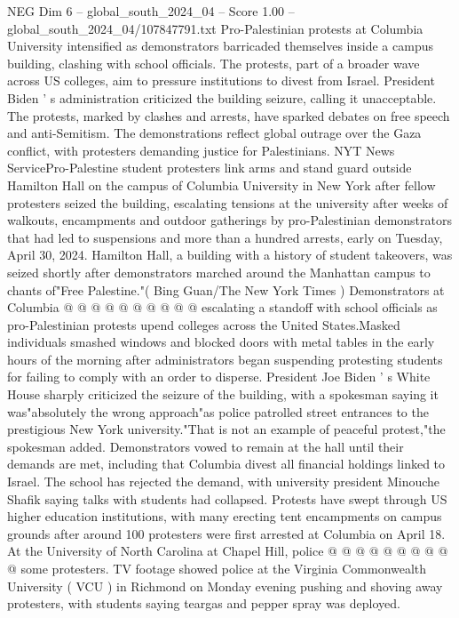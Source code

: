 \begin{textsample}{NEG Dim 6 – global\_south\_2024\_04 – Score 1.00 – global\_south\_2024\_04/107847791.txt}  \label{ex:f6_neg_363}
Pro-Palestinian protests at Columbia University intensified as demonstrators barricaded themselves inside a campus building, clashing with school officials.
The protests, part of a broader wave across US colleges, aim to pressure institutions to divest from Israel.
President Biden ' s administration criticized the building seizure, calling it unacceptable.
The protests, marked by clashes and arrests, have sparked debates on free speech and anti-Semitism.
The demonstrations reflect global outrage over the Gaza conflict, with protesters demanding justice for Palestinians.
NYT News ServicePro-Palestine student protesters link arms and stand guard outside Hamilton Hall on the campus of Columbia University in New York after fellow protesters seized the building, escalating tensions at the university after weeks of walkouts, encampments and outdoor gatherings by pro-Palestinian demonstrators that had led to suspensions and more than a hundred arrests, early on Tuesday, April 30, 2024.
Hamilton Hall, a building with a history of student takeovers, was seized shortly after demonstrators marched around the Manhattan campus to chants of"Free Palestine."( Bing Guan/The New York Times ) Demonstrators at Columbia @ @ @ @ @ @ @ @ @ @ escalating a standoff with school officials as pro-Palestinian protests upend colleges across the United States.Masked individuals smashed windows and blocked doors with metal tables in the early hours of the morning after administrators began suspending protesting students for failing to comply with an order to disperse.
President Joe Biden ' s White House sharply criticized the seizure of the building, with a spokesman saying it was"absolutely the wrong approach"as police patrolled street entrances to the prestigious New York university."That is not an example of peaceful protest,"the spokesman added.
Demonstrators vowed to remain at the hall until their demands are met, including that Columbia divest all financial holdings linked to Israel.
The school has rejected the demand, with university president Minouche Shafik saying talks with students had collapsed.
Protests have swept through US higher education institutions, with many erecting tent encampments on campus grounds after around 100 protesters were first arrested at Columbia on April 18.
At the University of North Carolina at Chapel Hill, police @ @ @ @ @ @ @ @ @ @ some protesters.
TV footage showed police at the Virginia Commonwealth University ( VCU ) in Richmond on Monday evening pushing and shoving away protesters, with students saying teargas and pepper spray was deployed.

\end{textsample}
